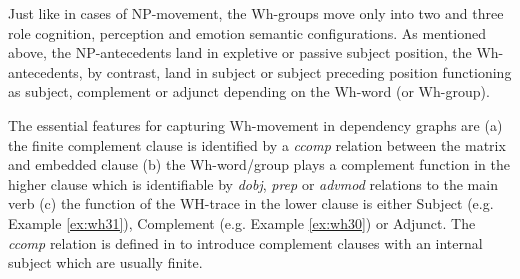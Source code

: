     \begin{table}[!ht]
        \caption{Functions and features of Wh-words and groups}
        \label{tab:wh-functions}
    \end{table}


    Just like in cases of NP-movement, the Wh-groups move only into two and three role cognition, perception and emotion semantic configurations. As mentioned above, the NP-antecedents land in expletive or passive subject position, the Wh-antecedents, by contrast, land in subject or subject preceding position functioning as subject, complement or adjunct depending on the Wh-word (or Wh-group).

    The essential features for capturing Wh-movement in dependency graphs are (a) the finite complement clause is identified by a \textit{ccomp} relation between the matrix and embedded clause (b) the Wh-word/group plays a complement function in the higher clause which is identifiable by \textit{dobj}, \textit{prep} or \textit{advmod} relations to the main verb (c) the function of the WH-trace in the lower clause is either Subject (e.g. Example \ref{ex:wh31}), Complement (e.g. Example \ref{ex:wh30}) or Adjunct. 
    The \textit{ccomp} relation is defined in \cite{Marneffe2008} to introduce complement clauses with an internal subject which are usually finite. %

